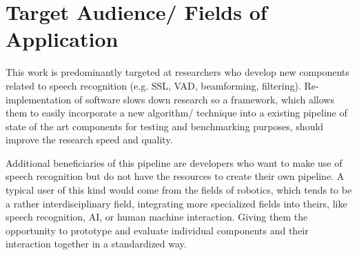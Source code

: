 \section{Target Audience/ Fields of Application}

This work is predominantly targeted at researchers who develop new components related to speech recognition (e.g. SSL, VAD, beamforming, filtering). 
Re-implementation of software slows down research so a framework, which allows them to easily incorporate a new algorithm/ technique into a existing pipeline of state of the art components for testing and benchmarking purposes, should improve the research speed and quality.

Additional beneficiaries of this pipeline are developers who want to make use of speech recognition but do not have the resources to create their own pipeline.
A typical user of this kind would come from the fields of robotics, which tends to be a rather interdisciplinary field, integrating more specialized fields into theirs, like speech recognition, AI, or human machine interaction.
Giving them the opportunity to prototype and evaluate individual components and their interaction together in a standardized way.
